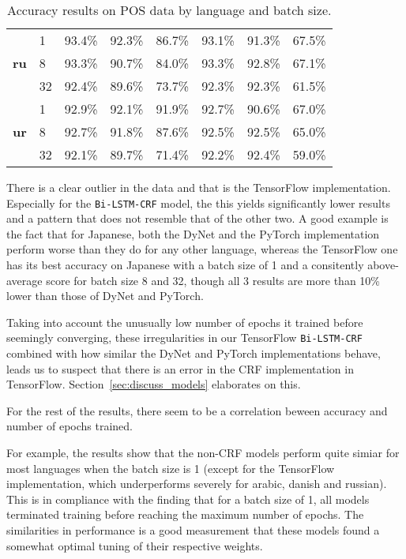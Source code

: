 \begin{table}[h]
\begin{tabular}{c l c c c|c c c}
        \cmidrule(lr){1-8}
        \multirow{3}{*}{\bfseries ru}
        &  1 & 93.4\% & 92.3\% & 86.7\% & 93.1\% & 91.3\% & 67.5\% \\
        &  8 & 93.3\% & 90.7\% & 84.0\% & 93.3\% & 92.8\% & 67.1\% \\
        & 32 & 92.4\% & 89.6\% & 73.7\% & 92.3\% & 92.3\% & 61.5\% \\

        \cmidrule(lr){1-8}
        \multirow{3}{*}{\bfseries ur}
        &  1 & 92.9\% & 92.1\% & 91.9\% & 92.7\% & 90.6\% & 67.0\% \\
        &  8 & 92.7\% & 91.8\% & 87.6\% & 92.5\% & 92.5\% & 65.0\% \\
        & 32 & 92.1\% & 89.7\% & 71.4\% & 92.2\% & 92.4\% & 59.0\% \\
        \bottomrule
    \end{tabular}
    \caption{Accuracy results on POS data by language and batch size.
    }\label{table:acc-total-pos}
\end{table}


There is a clear outlier in the data and that is the TensorFlow implementation.
Especially for the \texttt{Bi-LSTM-CRF} model, the this yields significantly
lower results and a pattern that does not resemble that of the other two. A good
example is the fact that for Japanese, both the DyNet and the PyTorch
implementation perform worse than they do for any other language, whereas the
TensorFlow one has its best accuracy on Japanese with a batch size of 1 and  a
consitently above-average score for batch size 8 and 32, though all 3 results
are more than 10\% lower than those of DyNet and PyTorch.

Taking into account the unusually low number of epochs it trained before
seemingly converging, these irregularities in our TensorFlow
\texttt{Bi-LSTM-CRF} combined with how similar the DyNet and PyTorch
implementations behave, leads us to suspect that there is an error in the CRF
implementation in TensorFlow. Section~\ref{sec:discuss_models} elaborates on this.

For the rest of the results, there seem to be a correlation beween accuracy and
number of epochs trained.

For example, the results show that the non-CRF models perform quite simiar for
most languages when the batch size is 1 (except for the TensorFlow
implementation, which underperforms severely for arabic, danish and russian).
This is in compliance with the finding that for a batch size of 1, all models
terminated training before reaching the maximum number of epochs. The
similarities in performance is a good measurement that these models found a
somewhat optimal tuning of their respective weights.

